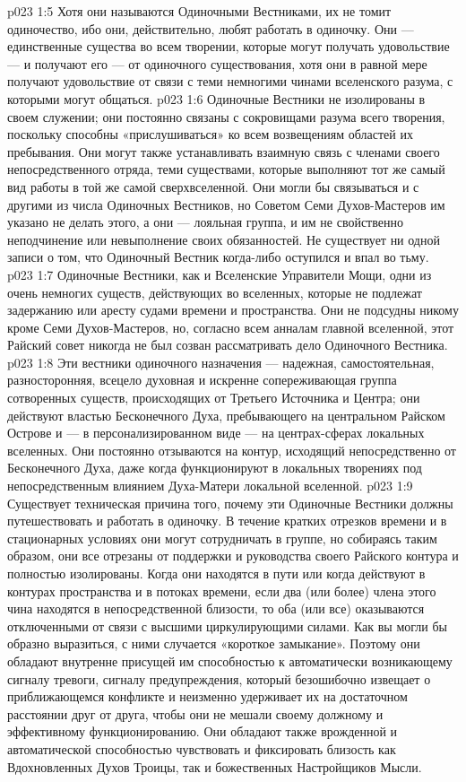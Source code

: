 \vs p023 1:5 Хотя они называются Одиночными Вестниками, их не томит одиночество, ибо они, действительно, любят работать в одиночку. Они --- единственные существа во всем творении, которые могут получать удовольствие --- и получают его --- от одиночного существования, хотя они в равной мере получают удовольствие от связи с теми немногими чинами вселенского разума, с которыми могут общаться.
\vs p023 1:6 \pc Одиночные Вестники не изолированы в своем служении; они постоянно связаны с сокровищами разума всего творения, поскольку способны «прислушиваться» ко всем возвещениям областей их пребывания. Они могут также устанавливать взаимную связь с членами своего непосредственного отряда, теми существами, которые выполняют тот же самый вид работы в той же самой сверхвселенной. Они могли бы связываться и с другими из числа Одиночных Вестников, но Советом Семи Духов\hyp{}Мастеров им указано не делать этого, а они --- лояльная группа, и им не свойственно неподчинение или невыполнение своих обязанностей. Не существует ни одной записи о том, что Одиночный Вестник когда\hyp{}либо оступился и впал во тьму.
\vs p023 1:7 Одиночные Вестники, как и Вселенские Управители Мощи, одни из очень немногих существ, действующих во вселенных, которые не подлежат задержанию или аресту судами времени и пространства. Они не подсудны никому кроме Семи Духов\hyp{}Мастеров, но, согласно всем анналам главной вселенной, этот Райский совет никогда не был созван рассматривать дело Одиночного Вестника.
\vs p023 1:8 Эти вестники одиночного назначения --- надежная, самостоятельная, разносторонняя, всецело духовная и искренне сопереживающая группа сотворенных существ, происходящих от Третьего Источника и Центра; они действуют властью Бесконечного Духа, пребывающего на центральном Райском Острове и --- в персонализированном виде --- на центрах\hyp{}сферах локальных вселенных. Они постоянно отзываются на контур, исходящий непосредственно от Бесконечного Духа, даже когда функционируют в локальных творениях под непосредственным влиянием Духа\hyp{}Матери локальной вселенной.
\vs p023 1:9 \pc Существует техническая причина того, почему эти Одиночные Вестники должны путешествовать и работать в одиночку. В течение кратких отрезков времени и в стационарных условиях они могут сотрудничать в группе, но собираясь таким образом, они все отрезаны от поддержки и руководства своего Райского контура и полностью изолированы. Когда они находятся в пути или когда действуют в контурах пространства и в потоках времени, если два (или более) члена этого чина находятся в непосредственной близости, то оба (или все) оказываются отключенными от связи с высшими циркулирующими силами. Как вы могли бы образно выразиться, с ними случается «короткое замыкание». Поэтому они обладают внутренне присущей им способностью к автоматически возникающему сигналу тревоги, сигналу предупреждения, который безошибочно извещает о приближающемся конфликте и неизменно удерживает их на достаточном расстоянии друг от друга, чтобы они не мешали своему должному и эффективному функционированию. Они обладают также врожденной и автоматической способностью чувствовать и фиксировать близость как Вдохновленных Духов Троицы, так и божественных Настройщиков Мысли.
